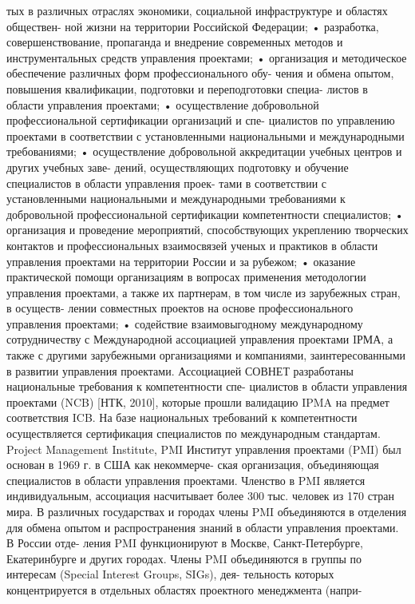 тых в различных отраслях экономики, социальной инфраструктуре и областях обществен-
ной жизни на территории Российской Федерации;
• разработка, совершенствование, пропаганда и внедрение современных методов и
инструментальных средств управления проектами;
• организация и методическое обеспечение различных форм профессионального обу-
чения и обмена опытом, повышения квалификации, подготовки и переподготовки специа-
листов в области управления проектами;
• осуществление добровольной профессиональной сертификации организаций и спе-
циалистов по управлению проектами в соответствии с установленными национальными и
международными требованиями;
• осуществление добровольной аккредитации учебных центров и других учебных заве-
дений, осуществляющих подготовку и обучение специалистов в области управления проек-
тами в соответствии с установленными национальными и международными требованиями
к добровольной профессиональной сертификации компетентности специалистов;
• организация и проведение мероприятий, способствующих укреплению творческих
контактов и профессиональных взаимосвязей ученых и практиков в области управления
проектами на территории России и за рубежом;
• оказание практической помощи организациям в вопросах применения методологии
управления проектами, а также их партнерам, в том числе из зарубежных стран, в осуществ-
лении совместных проектов на основе профессионального управления проектами;
• содействие взаимовыгодному международному сотрудничеству с Международной
ассоциацией управления проектами IРМА, а также с другими зарубежными организациями
и компаниями, заинтересованными в развитии управления проектами.
Ассоциацией СОВНЕТ разработаны национальные требования к компетентности спе-
циалистов в области управления проектами (NCB) [НТК, 2010], которые прошли валидацию
IPMA на предмет соответствия ICB. На базе национальных требований к компетентности
осуществляется сертификация специалистов по международным стандартам.
Project Management Institute, PMI
Институт управления проектами (PMI) был основан в 1969 г. в США как некоммерче-
ская организация, объединяющая специалистов в области управления проектами. Членство
в PMI является индивидуальным, ассоциация насчитывает более 300 тыс. человек из 170
стран мира. В различных государствах и городах члены PMI объединяются в отделения для
обмена опытом и распространения знаний в области управления проектами. В России отде-
ления PMI функционируют в Москве, Санкт-Петербурге, Екатеринбурге и других городах.
Члены PMI объединяются в группы по интересам (Special Interest Groups, SIGs), дея-
тельность которых концентрируется в отдельных областях проектного менеджмента (напри-
